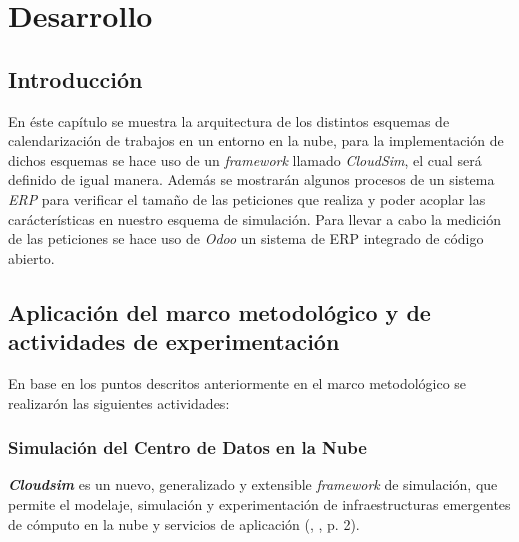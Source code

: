 \chead{}
\rhead{\thepage}



\chapter{Desarrollo}
\section*{Introducci\'on}

En \'este cap\'itulo se muestra la arquitectura de los distintos esquemas de calendarizaci\'on de trabajos en un entorno en la nube, para la implementaci\'on de dichos esquemas se hace uso de un \textit{framework} llamado \textit{CloudSim}, el cual ser\'a definido de igual manera. Además se mostrarán algunos procesos de un sistema \textit{ERP} para verificar el tamaño de las peticiones que realiza y poder acoplar las carácterísticas en nuestro esquema de simulación. Para llevar a cabo la medición de las peticiones se hace uso de \textit{Odoo} un sistema de ERP integrado de código abierto.







\newpage
{}
\section{Aplicaci\'on del marco metodol\'ogico y de actividades de experimentaci\'on}

En base en los puntos descritos anteriormente en el marco metodol\'ogico se realizar\'on las siguientes actividades:


\subsection{Simulaci\'on del Centro de Datos en la Nube}

 \textit{\textbf{Cloudsim}} es un nuevo, generalizado y extensible \textit{framework} de simulaci\'on, que permite el modelaje, simulaci\'on y experimentaci\'on de infraestructuras emergentes de c\'omputo en la nube y servicios de aplicaci\'on (\citeauthor{calheiros2011cloudsim}, \citeyear{calheiros2011cloudsim}, p. 2).


